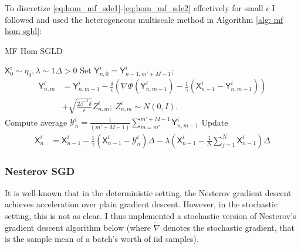 \documentclass{article}
\begin{document}
To discretize \ref{eq:hom_mf_sde1}-\ref{eq:hom_mf_sde2} effectively
for small $\epsilon$ I followed \cite{kantas2019sharpflatshallowweakly} and used the heterogeneous multiscale method \cite{weinan2005analysis} in Algorithm \ref{alg: mf hom sgld}:

\begin{examplesblock}{MF Hom SGLD}\label{alg: mf hom sgld}
\begin{algorithmic}
	\Require $\mathsf{X}_{0}^{i}\sim\eta_{0}, \lambda \sim 1 \Delta >0$ 
\State Set $\mathsf{Y}_{n,0}^{i}=\mathsf{Y}_{n-1,m'+M-1}^{i}$;
\State \[\begin{array}{ll}
	\mathsf{Y}_{n,m}^{i} &=\mathsf{Y}_{n,m-1}^{i}-\frac{\delta}{\epsilon}\left(\nabla\Phi(\mathsf{Y}_{n,m-1}^{i})-\frac{1}{\gamma}(\mathsf{X}_{n-1}^{i}-\mathsf{Y}_{n,m-1}^{i})\right)\\&+\sqrt{\frac{2\beta^{-1}\delta}{\epsilon}}Z_{n,m}^{i};\:Z_{n,m}^{i}\sim N(0,I).
\end{array}\]
\EndFor
\State Compute average $\mathcal{Y}_{n}^{i}=\frac{1}{(m'+M-1)}\displaystyle\sum_{m=m'}^{m'+M-1}\mathsf{Y}_{n,m-1}^{i}$
\State Update
 \State  
\begin{align*}
\mathsf{X}_{n}^{i} & =\mathsf{X}_{n-1}^{i}-\frac{1}{\gamma}(\mathsf{X}_{n-1}^{i}-\mathcal{Y}_{n}^{i})\Delta-\lambda\left(\mathsf{X}_{n-1}^{i}-\frac{1}{N}\displaystyle\sum_{j=1}^{N}\mathsf{X}_{n-1}^{i}\right)\Delta
\end{align*}
\EndFor 
\end{algorithmic}
\end{examplesblock}

\subsubsection{Nesterov SGD}

It is well-known that in the deterministic setting, the Nesterov gradient descent achieves acceleration over plain gradient descent. However, in the stochastic setting, this is not as clear. I thus implemented a stochastic version of Nesterov's gradient descent algorithm below (where $ \tilde{\nabla}$ denotes the stochastic gradient, that is the sample mean of a batch's worth of iid samples).
\end{document}
